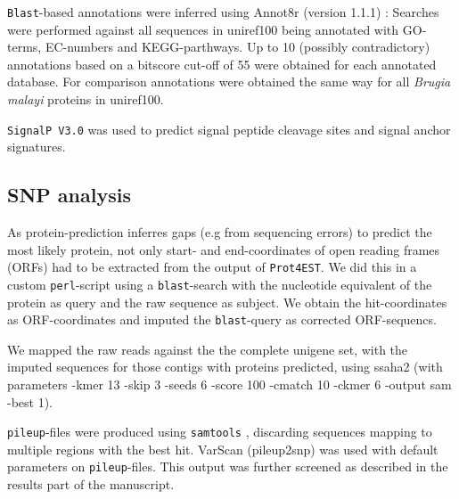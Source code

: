 \documentclass[10pt]{bmc_article}
\newenvironment{bmcformat}{\begin{raggedright}\baselineskip20pt\sloppy\setboolean{publ}{false}}{\end{raggedright}\baselineskip20pt\sloppy}
\begin{document}
\begin{bmcformat}
\texttt{Blast}-based annotations were inferred using Annot8r (version
1.1.1) \cite{schmid_annot8r:_2008}: Searches were performed against
all sequences in uniref100 \cite{pmid18836194} being annotated with
GO-terms, EC-numbers and KEGG-parthways. Up to 10 (possibly
contradictory) annotations based on a bitscore cut-off of 55 were
obtained for each annotated database.  For comparison annotations were
obtained the same way for all \textit{Brugia malayi} proteins in
uniref100.


\texttt{SignalP V3.0} \cite{pmid17446895} was used to predict signal
peptide cleavage sites and signal anchor signatures.

\subsection*{SNP analysis}

As protein-prediction inferres gaps (e.g from sequencing errors) to
predict the most likely protein, not only start- and end-coordinates
of open reading frames (ORFs) had to be extracted from the output of
\texttt{Prot4EST}. We did this in a custom \texttt{perl}-script using
a \texttt{blast}-search with the nucleotide equivalent of the protein
as query and the raw sequence as subject. We obtain the
hit-coordinates as ORF-coordinates and imputed the
\texttt{blast}-query as corrected ORF-sequencs.

We mapped the raw reads against the the complete unigene set, with the
imputed sequences for those contigs with proteins predicted, using
ssaha2 (with parameters -kmer 13 -skip 3 -seeds 6 -score 100 -cmatch
10 -ckmer 6 -output sam -best 1).

\texttt{pileup}-files were produced using \texttt{samtools}
\cite{journals/bioinformatics/LiHWFRHMAD09}, discarding sequences
mapping to multiple regions with the best hit. VarScan
\cite{pmid19542151} (pileup2snp) was used with default parameters on
\texttt{pileup}-files. This output was further screened as described
in the results part of the manuscript.




\end{bmcformat}
\end{document}
